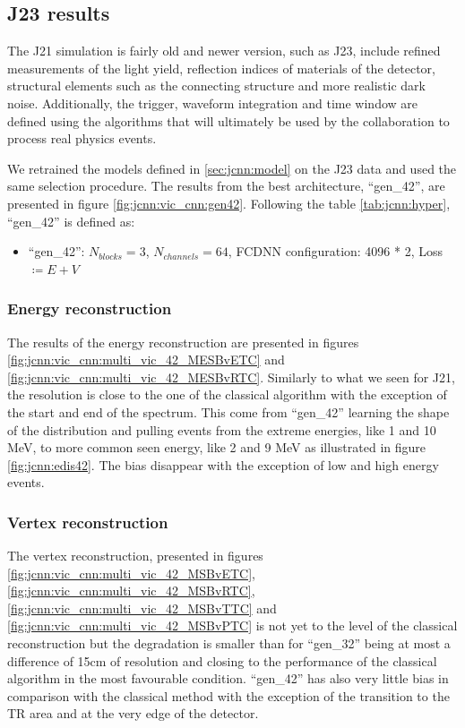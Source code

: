 \documentclass[../main.tex]{subfiles}
\begin{document}
\subsection{J23 results}

The J21 simulation is fairly old and newer version, such as J23, include refined measurements of the light yield, reflection indices of materials of the detector, structural elements such as the connecting structure and more realistic dark noise. Additionally, the trigger, waveform integration and time window are defined using the algorithms that will ultimately be used by the collaboration to process real physics events.

We retrained the models defined in \ref{sec:jcnn:model} on the J23 data and used the same selection procedure. The results from the best architecture, ``gen\_42'', are presented in figure \ref{fig:jcnn:vic_cnn:gen42}. Following the table \ref{tab:jcnn:hyper}, ``gen\_42'' is defined as:
\begin{itemize}
 \item ``gen\_42'': $N_{blocks} = 3$, $N_{channels} = 64$, FCDNN configuration: 4096 * 2, Loss $\coloneq E+V$
\end{itemize}

\subsubsection{Energy reconstruction}

The results of the energy reconstruction are presented in figures \ref{fig:jcnn:vic_cnn:multi_vic_42_MESBvETC} and \ref{fig:jcnn:vic_cnn:multi_vic_42_MESBvRTC}. Similarly to what we seen for J21, the resolution is close to the one of the classical algorithm with the exception of the start and end of the spectrum. This come from ``gen\_42'' learning the shape of the distribution and pulling events from the extreme energies, like 1 and 10 MeV, to more common seen energy, like 2 and 9 MeV as illustrated in figure \ref{fig:jcnn:edis42}. The bias disappear with the exception of low and high energy events.

\subsubsection{Vertex reconstruction}

The vertex reconstruction, presented in figures \ref{fig:jcnn:vic_cnn:multi_vic_42_MSBvETC}, \ref{fig:jcnn:vic_cnn:multi_vic_42_MSBvRTC}, \ref{fig:jcnn:vic_cnn:multi_vic_42_MSBvTTC} and \ref{fig:jcnn:vic_cnn:multi_vic_42_MSBvPTC} is not yet to the level of the classical reconstruction but the degradation is smaller than for ``gen\_32'' being at most a difference of 15cm of resolution and closing to the performance of the classical algorithm in the most favourable condition. ``gen\_42'' has also very little bias in comparison with the classical method with the exception of the transition to the TR area and at the very edge of the detector.
\end{document}
